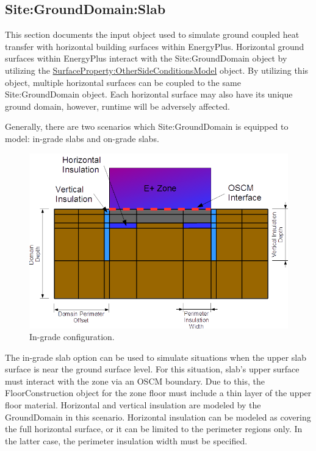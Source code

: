 \subsection{Site:GroundDomain:Slab}\label{sitegrounddomainslab}

This section documents the input object used to simulate ground coupled heat transfer with horizontal building surfaces within EnergyPlus. Horizontal ground surfaces within EnergyPlus interact with the Site:GroundDomain object by utilizing the \hyperref[surfacepropertyothersideconditionsmodel]{SurfaceProperty:OtherSideConditionsModel} object. By utilizing this object, multiple horizontal surfaces can be coupled to the same Site:GroundDomain object. Each horizontal surface may also have its unique ground domain, however, runtime will be adversely affected.

Generally, there are two scenarios which Site:GroundDomain is equipped to model: in-grade slabs and on-grade slabs.

\begin{figure}[htbp]
\centering
\includegraphics{media/image012.png}
\caption{In-grade configuration. \protect \label{fig:in-grade-configuration}}
\end{figure}

The in-grade slab option can be used to simulate situations when the upper slab surface is near the ground surface level. For this situation, slab's upper surface must interact with the zone via an OSCM boundary. Due to this, the FloorConstruction object for the zone floor must include a thin layer of the upper floor material. Horizontal and vertical insulation are modeled by the GroundDomain in this scenario. Horizontal insulation can be modeled as covering the full horizontal surface, or it can be limited to the perimeter regions only. In the latter case, the perimeter insulation width must be specified.

